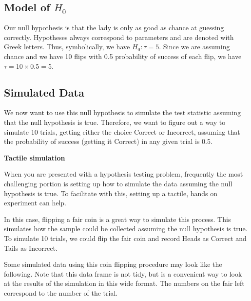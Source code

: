 \documentclass[]{tufte-book}
\begin{document}
\subsection{\texorpdfstring{Model of
\(H_0\)}{Model of H\_0}}\label{model-of-h_0}

Our null hypothesis is that the lady is only as good as chance at
guessing correctly. Hypotheses always correspond to parameters and are
denoted with Greek letters. Thus, symbolically, we have
\(H_0: \tau = 5\). Since we are assuming chance and we have 10 flips
with 0.5 probability of success of each flip, we have
\(\tau = 10 \times 0.5 = 5\).

\subsection{Simulated Data}\label{simulated-data}

We now want to use this null hypothesis to simulate the test statistic
assuming that the null hypothesis is true. Therefore, we want to figure
out a way to simulate 10 trials, getting either the choice Correct or
Incorrect, assuming that the probability of success (getting it Correct)
in any given trial is 0.5.

\textbf{Tactile simulation}

When you are presented with a hypothesis testing problem, frequently the
most challenging portion is setting up how to simulate the data assuming
the null hypothesis is true. To facilitate with this, setting up a
tactile, hands on experiment can help.

In this case, flipping a fair coin is a great way to simulate this
process. This simulates how the sample could be collected assuming the
null hypothesis is true. To simulate 10 trials, we could flip the fair
coin and record Heads as Correct and Tails as Incorrect.

Some simulated data using this coin flipping procedure may look like the
following. Note that this data frame is not tidy, but is a convenient
way to look at the results of the simulation in this wide format. The
numbers on the fair left correspond to the number of the trial.
\end{document}
